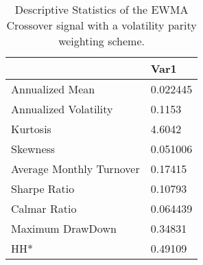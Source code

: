 \begin{table}[H]
\centering
\begin{tabular}{ll}
\hline& Var1 \\ 
\hline 
Annualized Mean & 0.022445 \\ 
Annualized Volatility & 0.1153 \\ 
Kurtosis & 4.6042 \\ 
Skewness & 0.051006 \\ 
Average Monthly Turnover & 0.17415 \\ 
Sharpe Ratio & 0.10793 \\ 
Calmar Ratio & 0.064439 \\ 
Maximum DrawDown & 0.34831 \\ 
HH* & 0.49109 \\ 
\hline
\end{tabular}
\caption{Descriptive Statistics of the EWMA Crossover signal with a volatility parity weighting scheme.}
\label{MBBSVPNR}
\end{table}